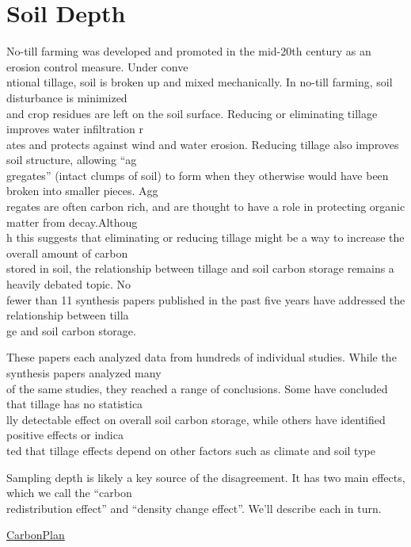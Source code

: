 \documentclass[
]{book}
\begin{document}
\hypertarget{soil-depth}{%
\section{Soil Depth}\label{soil-depth}}

No-till farming was developed and promoted in the mid-20th century as an erosion control measure. Under conve\\
ntional tillage, soil is broken up and mixed mechanically. In no-till farming, soil disturbance is minimized\\
and crop residues are left on the soil surface. Reducing or eliminating tillage improves water infiltration r\\
ates and protects against wind and water erosion. Reducing tillage also improves soil structure, allowing ``ag\\
gregates'' (intact clumps of soil) to form when they otherwise would have been broken into smaller pieces. Agg\\
regates are often carbon rich, and are thought to have a role in protecting organic matter from decay.Althoug\\
h this suggests that eliminating or reducing tillage might be a way to increase the overall amount of carbon\\
stored in soil, the relationship between tillage and soil carbon storage remains a heavily debated topic. No\\
fewer than 11 synthesis papers published in the past five years have addressed the relationship between tilla\\
ge and soil carbon storage.

These papers each analyzed data from hundreds of individual studies. While the synthesis papers analyzed many\\
of the same studies, they reached a range of conclusions. Some have concluded that tillage has no statistica\\
lly detectable effect on overall soil carbon storage, while others have identified positive effects or indica\\
ted that tillage effects depend on other factors such as climate and soil type

Sampling depth is likely a key source of the disagreement. It has two main effects, which we call the ``carbon\\
redistribution effect'' and ``density change effect''. We'll describe each in turn.

\href{https://carbonplan.org/research/soil-depth-sampling}{CarbonPlan}
\end{document}
